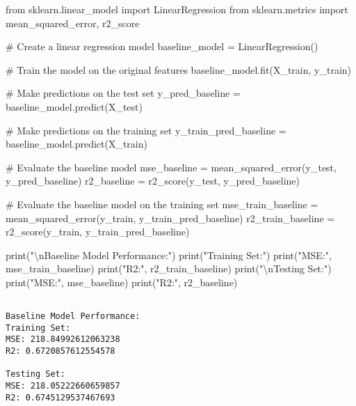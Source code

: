 \documentclass[
  letterpaper,
  DIV=11,
  numbers=noendperiod]{scrreprt}
\newenvironment{Shaded}{\begin{snugshade}}{\end{snugshade}}
\newcommand{\BuiltInTok}[1]{\textcolor[rgb]{0.00,0.23,0.31}{#1}}
\newcommand{\CharTok}[1]{\textcolor[rgb]{0.13,0.47,0.30}{#1}}
\newcommand{\CommentTok}[1]{\textcolor[rgb]{0.37,0.37,0.37}{#1}}
\newcommand{\ImportTok}[1]{\textcolor[rgb]{0.00,0.46,0.62}{#1}}
\newcommand{\NormalTok}[1]{\textcolor[rgb]{0.00,0.23,0.31}{#1}}
\newcommand{\OperatorTok}[1]{\textcolor[rgb]{0.37,0.37,0.37}{#1}}
\newcommand{\StringTok}[1]{\textcolor[rgb]{0.13,0.47,0.30}{#1}}
\begin{document}
\begin{Shaded}
\begin{Highlighting}[]
\ImportTok{from}\NormalTok{ sklearn.linear\_model }\ImportTok{import}\NormalTok{ LinearRegression}
\ImportTok{from}\NormalTok{ sklearn.metrics }\ImportTok{import}\NormalTok{ mean\_squared\_error, r2\_score}

\CommentTok{\# Create a linear regression model}
\NormalTok{baseline\_model }\OperatorTok{=}\NormalTok{ LinearRegression()}

\CommentTok{\# Train the model on the original features}
\NormalTok{baseline\_model.fit(X\_train, y\_train)}

\CommentTok{\# Make predictions on the test set}
\NormalTok{y\_pred\_baseline }\OperatorTok{=}\NormalTok{ baseline\_model.predict(X\_test)}

\CommentTok{\# Make predictions on the training set}
\NormalTok{y\_train\_pred\_baseline }\OperatorTok{=}\NormalTok{ baseline\_model.predict(X\_train)}

\CommentTok{\# Evaluate the baseline model}
\NormalTok{mse\_baseline }\OperatorTok{=}\NormalTok{ mean\_squared\_error(y\_test, y\_pred\_baseline)}
\NormalTok{r2\_baseline }\OperatorTok{=}\NormalTok{ r2\_score(y\_test, y\_pred\_baseline)}

\CommentTok{\# Evaluate the baseline model on the training set}
\NormalTok{mse\_train\_baseline }\OperatorTok{=}\NormalTok{ mean\_squared\_error(y\_train, y\_train\_pred\_baseline)}
\NormalTok{r2\_train\_baseline }\OperatorTok{=}\NormalTok{ r2\_score(y\_train, y\_train\_pred\_baseline)}

\BuiltInTok{print}\NormalTok{(}\StringTok{"}\CharTok{\textbackslash{}n}\StringTok{Baseline Model Performance:"}\NormalTok{)}
\BuiltInTok{print}\NormalTok{(}\StringTok{"Training Set:"}\NormalTok{)}
\BuiltInTok{print}\NormalTok{(}\StringTok{"MSE:"}\NormalTok{, mse\_train\_baseline)}
\BuiltInTok{print}\NormalTok{(}\StringTok{"R2:"}\NormalTok{, r2\_train\_baseline)}
\BuiltInTok{print}\NormalTok{(}\StringTok{"}\CharTok{\textbackslash{}n}\StringTok{Testing Set:"}\NormalTok{)}
\BuiltInTok{print}\NormalTok{(}\StringTok{"MSE:"}\NormalTok{, mse\_baseline)}
\BuiltInTok{print}\NormalTok{(}\StringTok{"R2:"}\NormalTok{, r2\_baseline)}

\end{Highlighting}
\end{Shaded}

\begin{verbatim}

Baseline Model Performance:
Training Set:
MSE: 218.84992612063238
R2: 0.6720857612554578

Testing Set:
MSE: 218.05222660659857
R2: 0.6745129537467693
\end{verbatim}
\end{document}
